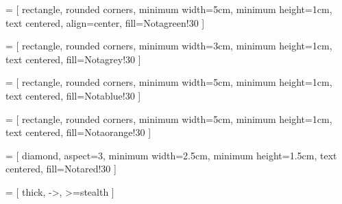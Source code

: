 \usepackage{tikz}
\usetikzlibrary{shapes.geometric, arrows}

 = [
    rectangle, rounded corners, 
    minimum width=5cm, 
    minimum height=1cm,
    text centered,  
    align=center,
    fill=Notagreen!30
]

 = [
    rectangle, rounded corners, 
    minimum width=3cm, 
    minimum height=1cm,
    text centered,  
    fill=Notagrey!30
]

 = [
    rectangle, rounded corners, 
    minimum width=5cm, 
    minimum height=1cm, 
    text centered, 
    fill=Notablue!30
]

 = [
    rectangle, rounded corners, 
    minimum width=5cm, 
    minimum height=1cm, 
    text centered, 
    fill=Notaorange!30
]

 = [
    diamond,
    aspect=3,
    minimum width=2.5cm, 
    minimum height=1.5cm, 
    text centered, 
    fill=Notared!30
]

 = [
    thick,
    ->,
    >=stealth
]